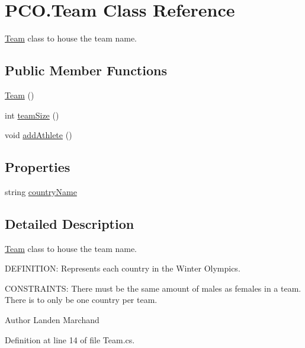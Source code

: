 \hypertarget{classPCO_1_1Team}{\section{P\+C\+O.\+Team Class Reference}
\label{classPCO_1_1Team}
}


\hyperlink{classPCO_1_1Team}{Team} class to house the team name.  


\subsection*{Public Member Functions}
\begin{DoxyCompactItemize}
\item 
\hyperlink{classPCO_1_1Team_a90aa98cc87012423a1ea29958ec92cbf}{Team} ()
\item 
int \hyperlink{classPCO_1_1Team_a6dcef9291a91023364896f67baec58ce}{team\+Size} ()
\item 
void \hyperlink{classPCO_1_1Team_a9ac920c7b0e54da02f45ead54118775a}{add\+Athlete} ()
\end{DoxyCompactItemize}
\subsection*{Properties}
\begin{DoxyCompactItemize}
\item 
string \hyperlink{classPCO_1_1Team_a1bcba510cc543dda5ce68b295e9ee26e}{country\+Name}
\end{DoxyCompactItemize}


\subsection{Detailed Description}
\hyperlink{classPCO_1_1Team}{Team} class to house the team name. 

D\+E\+F\+I\+N\+I\+T\+I\+O\+N\+: Represents each country in the Winter Olympics.

C\+O\+N\+S\+T\+R\+A\+I\+N\+T\+S\+: There must be the same amount of males as females in a team. There is to only be one country per team.\begin{DoxyAuthor}{Author}
Landen Marchand 
\end{DoxyAuthor}


Definition at line 14 of file Team.\+cs.



